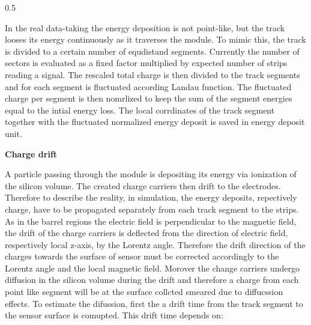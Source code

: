                  {0.5}       %
                 { }

In the real data-taking the energy deposition is not point-like, but the track looses its energy continuously as it traverses the module. To mimic this, the track is divided to a certain number of equdistand segments. Currently the number of sectors is evaluated as a fixed factor multiplied by expected number of strips reading a signal. The rescaled total charge is then divided to the track segments and for each segment is fluctuated according Landau function. The fluctuated charge per segment is then nomrlized to keep the sum of the segment energies equal to the intial energy loss. The local corrdinates of the track segment together with the fluctuated normalized energy deposit is saved in energy deposit unit.



\textbf{Charge drift}

A particle passing through the module is depositing its energy via ionization of the silicon volume. The created charge carriers then drift to the electrodes. Therefore to describe the reality, in simulation, the energy deposits, repectively charge, have to be propagated separately from each track segment to the strips. As in the barrel regions the electric field is perpendicular to the magnetic field, the drift of the charge carriers is deflected from the direction of electric field, respectively local z-axis, by the Lorentz angle. Therefore the drift direction of the charges towards the surface of sensor must be corrected accordingly to the Lorentz angle and the local magnetic field. Morover the change carriers undergo diffusion in the silicon volume during the drift and therefore a charge from each point like segment will be at the surface collcted smeared due to diffucssion effects. To estimate the difussion, first the a drift time from the track segment to the sensor surface is comupted. This drift time depends on:

